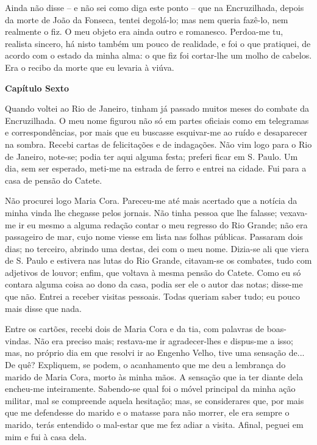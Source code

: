 Ainda não disse -- e não sei como diga este ponto -- que na
Encruzilhada, depois da morte de João da Fonseca, tentei degolá-lo; mas
nem queria fazê-lo, nem realmente o fiz. O meu objeto era ainda outro e
romanesco. Perdoa-me tu, realista sincero, há nisto também um pouco de
realidade, e foi o que pratiquei, de acordo com o estado da minha alma:
o que fiz foi cortar-lhe um molho de cabelos. Era o recibo da morte que
eu levaria à viúva.

\textbf{Capítulo Sexto}

Quando voltei ao Rio de Janeiro, tinham já passado muitos meses do
combate da Encruzilhada. O meu nome figurou não só em partes oficiais
como em telegramas e correspondências, por mais que eu buscasse
esquivar-me ao ruído e desaparecer na sombra. Recebi cartas de
felicitações e de indagações. Não vim logo para o Rio de Janeiro,
note-se; podia ter aqui alguma festa; preferi ficar em S. Paulo. Um dia,
sem ser esperado, meti-me na estrada de ferro e entrei na cidade. Fui
para a casa de pensão do Catete.

Não procurei logo Maria Cora. Pareceu-me até mais acertado que a notícia
da minha vinda lhe chegasse pelos jornais. Não tinha pessoa que lhe
falasse; vexava-me ir eu mesmo a alguma redação contar o meu regresso do
Rio Grande; não era passageiro de mar, cujo nome viesse em lista nas
folhas públicas. Passaram dois dias; no terceiro, abrindo uma destas,
dei com o meu nome. Dizia-se ali que viera de S. Paulo e estivera nas
lutas do Rio Grande, citavam-se os combates, tudo com adjetivos de
louvor; enfim, que voltava à mesma pensão do Catete. Como eu só contara
alguma coisa ao dono da casa, podia ser ele o autor das notas; disse-me
que não. Entrei a receber visitas pessoais. Todas queriam saber tudo; eu
pouco mais disse que nada.

Entre os cartões, recebi dois de Maria Cora e da tia, com palavras de
boas-vindas. Não era preciso mais; restava-me ir agradecer-lhes e
dispus-me a isso; mas, no próprio dia em que resolvi ir ao Engenho
Velho, tive uma sensação de... De quê? Expliquem, se podem, o
acanhamento que me deu a lembrança do marido de Maria Cora, morto às
minha mãos. A sensação que ia ter diante dela encheu-me inteiramente.
Sabendo-se qual foi o móvel principal da minha ação militar, mal se
compreende aquela hesitação; mas, se considerares que, por mais que me
defendesse do marido e o matasse para não morrer, ele era sempre o
marido, terás entendido o mal-estar que me fez adiar a visita. Afinal,
peguei em mim e fui à casa dela.

